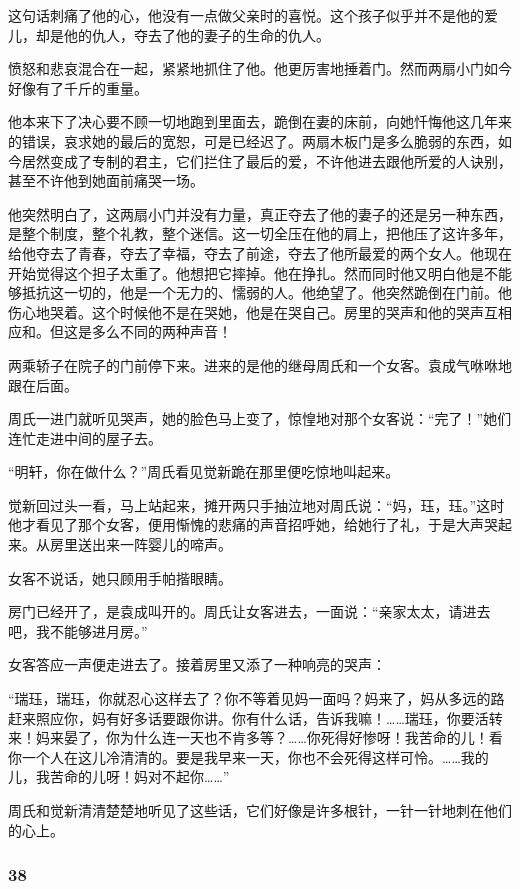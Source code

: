 \par 这句话刺痛了他的心，他没有一点做父亲时的喜悦。这个孩子似乎并不是他的爱儿，却是他的仇人，夺去了他的妻子的生命的仇人。
\par 愤怒和悲哀混合在一起，紧紧地抓住了他。他更厉害地捶着门。然而两扇小门如今好像有了千斤的重量。
\par 他本来下了决心要不顾一切地跑到里面去，跪倒在妻的床前，向她忏悔他这几年来的错误，哀求她的最后的宽恕，可是已经迟了。两扇木板门是多么脆弱的东西，如今居然变成了专制的君主，它们拦住了最后的爱，不许他进去跟他所爱的人诀别，甚至不许他到她面前痛哭一场。
\par 他突然明白了，这两扇小门并没有力量，真正夺去了他的妻子的还是另一种东西，是整个制度，整个礼教，整个迷信。这一切全压在他的肩上，把他压了这许多年，给他夺去了青春，夺去了幸福，夺去了前途，夺去了他所最爱的两个女人。他现在开始觉得这个担子太重了。他想把它摔掉。他在挣扎。然而同时他又明白他是不能够抵抗这一切的，他是一个无力的、懦弱的人。他绝望了。他突然跪倒在门前。他伤心地哭着。这个时候他不是在哭她，他是在哭自己。房里的哭声和他的哭声互相应和。但这是多么不同的两种声音！
\par 两乘轿子在院子的门前停下来。进来的是他的继母周氏和一个女客。袁成气咻咻地跟在后面。
\par 周氏一进门就听见哭声，她的脸色马上变了，惊惶地对那个女客说：“完了！”她们连忙走进中间的屋子去。
\par “明轩，你在做什么？”周氏看见觉新跪在那里便吃惊地叫起来。
\par 觉新回过头一看，马上站起来，摊开两只手抽泣地对周氏说：“妈，珏，珏。”这时他才看见了那个女客，便用惭愧的悲痛的声音招呼她，给她行了礼，于是大声哭起来。从房里送出来一阵婴儿的啼声。
\par 女客不说话，她只顾用手帕揩眼睛。
\par 房门已经开了，是袁成叫开的。周氏让女客进去，一面说：“亲家太太，请进去吧，我不能够进月房。”
\par 女客答应一声便走进去了。接着房里又添了一种响亮的哭声：
\par “瑞珏，瑞珏，你就忍心这样去了？你不等着见妈一面吗？妈来了，妈从多远的路赶来照应你，妈有好多话要跟你讲。你有什么话，告诉我嘛！……瑞珏，你要活转来！妈来晏了，你为什么连一天也不肯多等？……你死得好惨呀！我苦命的儿！看你一个人在这儿冷清清的。要是我早来一天，你也不会死得这样可怜。……我的儿，我苦命的儿呀！妈对不起你……”
\par 周氏和觉新清清楚楚地听见了这些话，它们好像是许多根针，一针一针地刺在他们的心上。



\subsubsection*{38}

